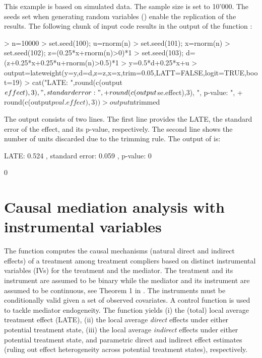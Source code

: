 \documentclass[nojss]{jss}
\begin{document}
This example is based on simulated data. The sample size  is set to 10'000. The seeds set when generating random variables () enable the replication of the results. The following chunk of  input code results in the output of the function :

\begin{Schunk}
\begin{Sinput}
> n=10000
> set.seed(100); u=rnorm(n)
> set.seed(101); x=rnorm(n)
> set.seed(102); z=(0.25*x+rnorm(n)>0)*1
> set.seed(103); d=(z+0.25*x+0.25*u+rnorm(n)>0.5)*1
> y=0.5*d+0.25*x+u
> output=lateweight(y=y,d=d,z=z,x=x,trim=0.05,LATT=FALSE,logit=TRUE,boot=19)
> cat("LATE: ",round(c(output$effect),3),", standard error: ",
+              round(c(output$se.effect),3), ", p-value: ",
+              round(c(output$pval.effect),3))
> output$ntrimmed
\end{Sinput}
\end{Schunk}


The output consists of two lines. The first line provides the LATE, the standard error of the effect, and its p-value, respectively. The second line shows the number of units discarded due to the trimming rule. The output of  is:

\begin{Schunk}
\begin{Soutput}
LATE:  0.524 , standard error:  0.059 , p-value:  0
\end{Soutput}
\begin{Soutput}
[1] 0
\end{Soutput}
\end{Schunk}


\section{Causal mediation analysis with instrumental variables}\label{iv_mediation}

The function  computes the causal mechanisms (natural direct and indirect effects) of a treatment among treatment compliers based on distinct instrumental variables (IVs) for the treatment and the mediator. The treatment and its instrument are assumed to be binary while the mediator and its instrument are assumed to be continuous, see Theorem 1 in \citet{FrHu17}. The instruments must be conditionally valid given a set of observed covariates. A control function is used to tackle mediator endogeneity.  The function yields (i) the (total) local average treatment effect (LATE), (ii) the local average \emph{direct} effects under either potential treatment state, (iii) the local average \emph{indirect} effects under either potential treatment state, and parametric direct and indirect effect estimates (ruling out effect heterogeneity across potential treatment states), respectively.
\end{document}
